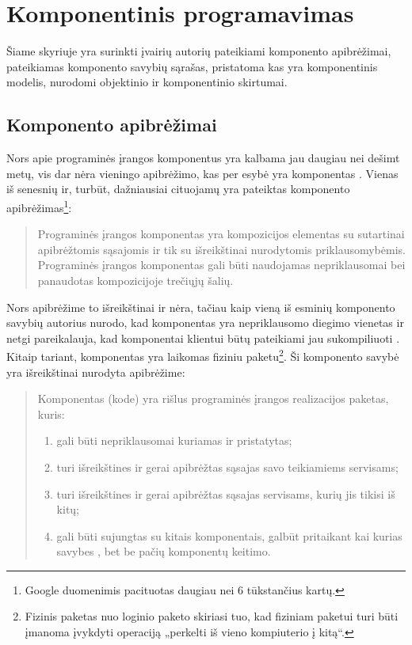 \chapter{Komponentinis programavimas}

\label{chapter:component}

Šiame skyriuje yra surinkti įvairių autorių pateikiami komponento
apibrėžimai, pateikiamas komponento savybių sąrašas, pristatoma kas
yra komponentinis modelis, nurodomi objektinio ir komponentinio
skirtumai.

\section{Komponento apibrėžimai}

Nors apie programinės įrangos komponentus yra kalbama jau daugiau
nei dešimt metų, vis dar nėra vieningo apibrėžimo, kas per esybė
yra komponentas \cite{classification-framework-for-scm}. Vienas
iš senesnių ir, turbūt, dažniausiai cituojamų yra 
\cite{cs-beyond-object-oriented-programming}
pateiktas komponento apibrėžimas\footnote{Google duomenimis pacituotas
daugiau nei 6 tūkstančius kartų.}:
\begin{quote}
  Programinės įrangos komponentas yra kompozicijos elementas su
  sutartinai apibrėžtomis sąsajomis ir tik su išreikštinai
  nurodytomis priklausomybėmis. Programinės įrangos komponentas
  gali būti naudojamas nepriklausomai bei panaudotas
  kompozicijoje trečiųjų šalių.
\end{quote}
Nors apibrėžime to išreikštinai ir nėra, tačiau kaip vieną iš
esminių komponento savybių autorius nurodo, kad komponentas yra
nepriklausomo diegimo vienetas 
\cite[36]{cs-beyond-object-oriented-programming} ir netgi
pareikalauja, kad komponentai klientui būtų pateikiami jau
sukompiliuoti \cite{point-counterpoint}. Kitaip tariant, komponentas
yra laikomas fiziniu paketu\footnote{Fizinis paketas nuo loginio paketo
skiriasi tuo, kad fiziniam paketui turi būti įmanoma įvykdyti
operaciją „perkelti iš vieno kompiuterio į kitą“.}. Ši
komponento savybė yra išreikštinai
nurodyta \cite[385]{objects-components-and-frameworks-with-uml}
apibrėžime:
\begin{quote}
  Komponentas (kode) yra rišlus programinės įrangos realizacijos
  paketas, kuris:
  \begin{enumerate}
    \item gali būti nepriklausomai kuriamas ir pristatytas;
    \item turi išreikštines ir gerai apibrėžtas sąsajas savo teikiamiems
      servisams;
    \item turi išreikštines ir gerai apibrėžtas sąsajas servisams,
      kurių jis tikisi iš kitų;
    \item gali būti sujungtas su kitais komponentais, galbūt pritaikant
      kai kurias savybes , bet be pačių komponentų
      keitimo.
  \end{enumerate}
\end{quote}
